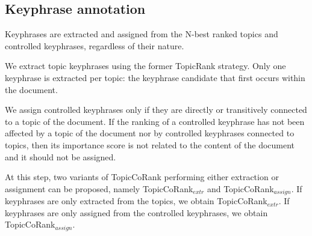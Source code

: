     \subsection{Keyphrase annotation}
    \label{subsec:keyphrase_assignment_and_extraction}
        Keyphrases are extracted and assigned from the N-best ranked topics and controlled keyphrases, regardless of their nature.
        
        We extract topic keyphrases using the former TopicRank strategy. Only one keyphrase is extracted per topic: the keyphrase candidate that first occurs within the document.
        
        We assign controlled keyphrases only if they are directly or transitively connected to a topic of the document. If the ranking of a controlled keyphrase has not been affected by a topic of the document nor by controlled keyphrases connected to topics, then its importance score is not related to the content of the document and it should not be assigned.


        At this step, two variants of TopicCoRank performing either extraction or assignment can be proposed, namely TopicCoRank$_\textit{extr}$ and TopicCoRank$_\textit{assign}$.
        If keyphrases are only extracted from the topics, we obtain TopicCoRank$_\textit{extr}$.
        If keyphrases are only assigned from the controlled keyphrases, we obtain TopicCoRank$_\textit{assign}$.
